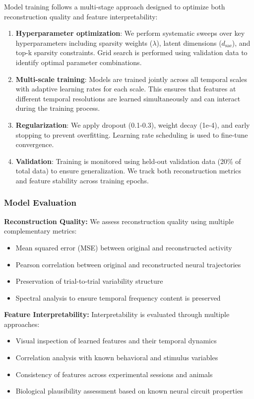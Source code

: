 Model training follows a multi-stage approach designed to optimize both reconstruction quality and feature interpretability:

\begin{enumerate}
\item \textbf{Hyperparameter optimization}: We perform systematic sweeps over key hyperparameters including sparsity weights ($\lambda$), latent dimensions ($d_{\text{sae}}$), and top-k sparsity constraints. Grid search is performed using validation data to identify optimal parameter combinations.

\item \textbf{Multi-scale training}: Models are trained jointly across all temporal scales with adaptive learning rates for each scale. This ensures that features at different temporal resolutions are learned simultaneously and can interact during the training process.

\item \textbf{Regularization}: We apply dropout (0.1-0.3), weight decay (1e-4), and early stopping to prevent overfitting. Learning rate scheduling is used to fine-tune convergence.

\item \textbf{Validation}: Training is monitored using held-out validation data (20\% of total data) to ensure generalization. We track both reconstruction metrics and feature stability across training epochs.
\end{enumerate}

\subsubsection{Model Evaluation}

\textbf{Reconstruction Quality:}
We assess reconstruction quality using multiple complementary metrics:
\begin{itemize}
\item Mean squared error (MSE) between original and reconstructed activity
\item Pearson correlation between original and reconstructed neural trajectories
\item Preservation of trial-to-trial variability structure
\item Spectral analysis to ensure temporal frequency content is preserved
\end{itemize}

\textbf{Feature Interpretability:}
Interpretability is evaluated through multiple approaches:
\begin{itemize}
\item Visual inspection of learned features and their temporal dynamics
\item Correlation analysis with known behavioral and stimulus variables
\item Consistency of features across experimental sessions and animals
\item Biological plausibility assessment based on known neural circuit properties
\end{itemize}

